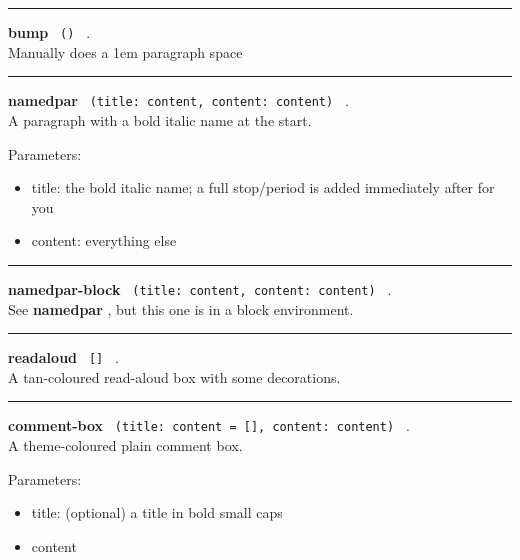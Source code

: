 \begin{center}\rule{0.5\linewidth}{0.5pt}\end{center}

\textbf{bump} \texttt{\ ()\ } .\\
Manually does a 1em paragraph space

\begin{center}\rule{0.5\linewidth}{0.5pt}\end{center}

\textbf{namedpar} \texttt{\ (title:\ content,\ content:\ content)\ } .\\
A paragraph with a bold italic name at the start.

Parameters:

\begin{itemize}
\tightlist
\item
  title: the bold italic name; a full stop/period is added immediately
  after for you
\item
  content: everything else
\end{itemize}

\begin{center}\rule{0.5\linewidth}{0.5pt}\end{center}

\textbf{namedpar-block}
\texttt{\ (title:\ content,\ content:\ content)\ } .\\
See \textbf{namedpar} , but this one is in a block environment.

\begin{center}\rule{0.5\linewidth}{0.5pt}\end{center}

\textbf{readaloud} \texttt{\ {[}{]}\ } .\\
A tan-coloured read-aloud box with some decorations.

\begin{center}\rule{0.5\linewidth}{0.5pt}\end{center}

\textbf{comment-box}
\texttt{\ (title:\ content\ =\ {[}{]},\ content:\ content)\ } .\\
A theme-coloured plain comment box.

Parameters:

\begin{itemize}
\tightlist
\item
  title: (optional) a title in bold small caps
\item
  content
\end{itemize}

